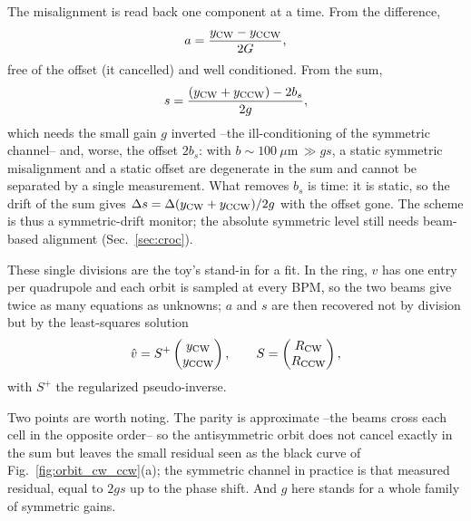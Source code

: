 \documentclass[aps,prab,reprint,superscriptaddress,nofootinbib]{revtex4-2}
\begin{document}
	The misalignment is read back one component at a time. From the difference,
	\begin{equation}
		a=\frac{y_{\rm CW}-y_{\rm CCW}}{2G},
	\end{equation}
	free of the offset (it cancelled) and well conditioned. From the sum,
	\begin{equation}
		s=\frac{(y_{\rm CW}+y_{\rm CCW})-2b_s}{2g},
	\end{equation}
	which needs the small gain $g$ inverted --the ill-conditioning of the symmetric channel-- and, worse, the offset $2b_s$: with $b\sim100~\mu$m$\,\gg gs$, a static symmetric
	misalignment and a static offset are degenerate in the sum and cannot be separated by a
	single measurement. What removes $b_s$ is time: it is static, so the drift of the sum gives $\Delta s=\Delta(y_{\rm CW}+y_{\rm CCW})/2g$ with the offset gone. The scheme is thus a symmetric-drift monitor; the absolute symmetric level still needs beam-based alignment (Sec.~\ref{sec:croc}).

	These single divisions are the toy's stand-in for a fit. In the ring, $v$ has one entry
	per quadrupole and each orbit is sampled at every BPM, so the two beams give twice as many equations as unknowns; $a$ and $s$ are then recovered not by division but by the
	least-squares solution
	\begin{equation}
		\hat v = S^{+}\begin{pmatrix}y_{\rm CW}\\ y_{\rm CCW}\end{pmatrix},
		\qquad
		S=\begin{pmatrix}R_{\rm CW}\\ R_{\rm CCW}\end{pmatrix},
	\end{equation}
	with $S^{+}$ the regularized pseudo-inverse.

	Two points are worth noting. The parity is approximate --the beams cross each cell in the opposite order-- so the antisymmetric orbit does not cancel exactly in the sum but leaves the small residual seen as the black curve of Fig.~\ref{fig:orbit_cw_ccw}(a); the symmetric channel in practice is that measured residual, equal to $2gs$ up to the phase shift. And $g$ here stands for a whole family of symmetric gains.
\end{document}
